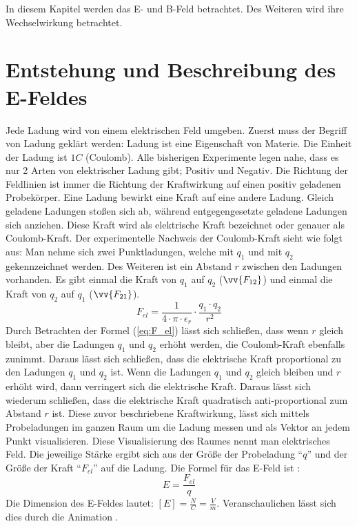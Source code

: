 In diesem Kapitel werden das E- und B-Feld betrachtet.
Des Weiteren wird ihre Wechselwirkung betrachtet.
\section{Entstehung und Beschreibung des E-Feldes}
Jede Ladung wird von einem elektrischen Feld umgeben.
Zuerst muss der Begriff von Ladung geklärt werden:
Ladung ist eine Eigenschaft von Materie.
Die Einheit der Ladung ist $1C$ (Coulomb).
Alle bisherigen Experimente legen nahe, dass es nur 2 Arten von elektrischer Ladung gibt; Positiv und Negativ.
Die Richtung der Feldlinien ist immer die Richtung der Kraftwirkung auf einen positiv geladenen Probekörper.
Eine Ladung bewirkt eine Kraft auf eine andere Ladung.
Gleich geladene Ladungen stoßen sich ab, während entgegengesetzte geladene Ladungen sich anziehen.
Diese Kraft wird als elektrische Kraft bezeichnet oder genauer als Coulomb-Kraft.
Der experimentelle Nachweis der Coulomb-Kraft sieht wie folgt aus:
Man nehme sich zwei Punktladungen, welche mit $q_1$ und mit $q_2$ gekennzeichnet werden. 
Des Weiteren ist ein Abstand $r$ zwischen den Ladungen vorhanden.
Es gibt einmal die Kraft von $q_1$ auf $q_2$ ($\vv{F_{12}}$) und einmal die Kraft von $q_2$ auf $q_1$ ($\vv{F_{21}}$).
\begin{equation}
\label{eq:F_el}
   F_{el} = \frac{1}{4 \cdot \pi \cdot \epsilon_r} \cdot \frac{q_1 \cdot q_2}{r^2}
\end{equation}
Durch Betrachten der Formel (\ref{eq:F_el}) lässt sich schließen, dass wenn $r$ gleich bleibt, aber die Ladungen $q_1$ und $q_2$ erhöht werden, die Coulomb-Kraft ebenfalls zunimmt.
Daraus lässt sich schließen, dass die elektrische Kraft proportional zu den Ladungen $q_1$ und $q_2$ ist. 
Wenn die Ladungen $q_1$ und $q_2$ gleich bleiben und $r$ erhöht wird, dann verringert sich die elektrische Kraft.
Daraus lässt sich wiederum schließen, dass die elektrische Kraft quadratisch anti-proportional zum Abstand $r$ ist.
Diese zuvor beschriebene Kraftwirkung, lässt sich mittels Probeladungen im ganzen Raum um die Ladung messen und als Vektor an jedem Punkt visualisieren.
Diese Visualisierung des Raumes nennt man elektrisches Feld.
Die jeweilige Stärke ergibt sich aus der Größe der Probeladung "`$q$"' und der Größe der Kraft "`$F_{el}$"' auf die Ladung.
Die Formel für das E-Feld ist :
\begin{equation}
\label{eq:E}
    E = \frac{F_{el}}{q}
\end{equation}
Die Dimension des E-Feldes lautet: $[E] = \frac{N}{C} = \frac{V}{m}$.
Veranschaulichen lässt sich dies durch die Animation \cite{Animation}.

